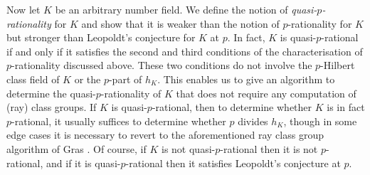 \documentclass[12pt, a4paper, usenames]{amsart}
\theoremstyle{plain}
\theoremstyle{remark}
\theoremstyle{definition}
\begin{document}
Now let $K$ be an arbitrary number field. We define the notion 
of \emph{quasi-$p$-rationality} for $K$ and show that it is weaker
than the notion of $p$-rationality for $K$ but stronger than 
Leopoldt's conjecture for $K$ at $p$. In fact, $K$
is quasi-$p$-rational if and only if it satisfies the second and third conditions of the characterisation of $p$-rationality discussed above. 
These two conditions do not involve the $p$-Hilbert class field of $K$ or the $p$-part of $h_{K}$.
This enables us to give an algorithm to determine the quasi-$p$-rationality of $K$
that does not require any computation of (ray) class groups.
If $K$ is quasi-$p$-rational, then to determine whether $K$ is in fact $p$-rational,
it usually suffices to determine whether $p$ divides $h_{K}$, though in some edge cases
it is necessary to revert to the aforementioned ray class group algorithm of Gras
\cite{MR4491965}. 
Of course, if $K$ is not quasi-$p$-rational then it is not $p$-rational,
and if it is quasi-$p$-rational then it satisfies Leopoldt's conjecture
at $p$. 
\end{document}
